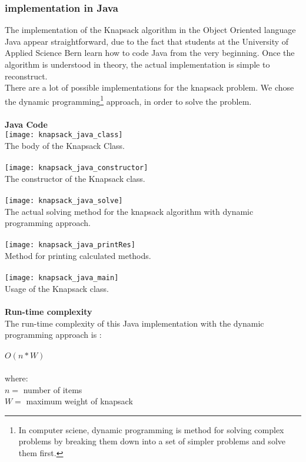 \subsubsection{implementation in Java}
The implementation of the Knapsack algorithm in the Object Oriented language Java appear straightforward, due to the fact that students at the University of Applied Science Bern learn how to code Java from the very beginning. Once the algorithm is understood in theory, the actual implementation is simple to reconstruct.\\ 
There are a lot of possible implementations for the knapsack problem. We chose the dynamic programming\footnote{In computer sciene, dynamic programming is method for solving complex problems by breaking them down into a set of simpler problems and solve them first.} approach, in order to solve the problem.\\\\
\textbf{Java Code}\\
\texttt{[image: knapsack\_java\_class]}\\
The body of the Knapsack Class.\\\\
\texttt{[image: knapsack\_java\_constructor]}\\
The constructor of the Knapsack class.\\\\
\texttt{[image: knapsack\_java\_solve]}\\
The actual solving method for the knapsack algorithm with dynamic programming approach.\\\\
\texttt{[image: knapsack\_java\_printRes]}\\
Method for printing calculated methods.\\\\
\texttt{[image: knapsack\_java\_main]}\\
Usage of the Knapsack class.\\\\

\textbf{Run-time complexity}\\
The run-time complexity of this Java implementation with the dynamic programming approach is :\\\\
\tab \tab \tab \tab \textbf{$O(n*W)$}\\\\
where:\\
$n = $ number of items\\
$W = $ maximum weight of knapsack
